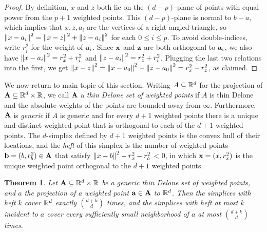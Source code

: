 \documentclass[10pt,a4paper]{article}
\newtheorem{theorem}{Theorem}[section]
\newcommand {\mm}[1] {\ifmmode{#1}\else{\mbox{\(#1\)}}\fi}
\theoremstyle{plain}
\newcommand{\Rspace}        {\mm{{\mathbb R}}}
\newcommand{\AAA}           {\mm{\bf A}}
\newcommand{\aaa}           {\mm{\bf a}}
\newcommand{\bbb}           {\mm{\bf b}}
\newcommand{\xxx}           {\mm{\bf{x}}}
\newcommand{\zzz}           {\mm{\bf{z}}}
\newcommand{\Edist}[2]      {\mm{\|{#1}-{#2}\|}}
\begin{document}
\begin{proof}
  By definition, $x$ and $z$ both lie on the $(d-p)$-plane of points with equal power from the $p+1$ weighted points.
  This $(d-p)$-plane is normal to $b-a$, which implies that $x, z, a_i$ are the vertices of a right-angled triangle, so $\Edist{x}{a_i}^2 = \Edist{x}{z}^2 + \Edist{z}{a_i}^2$ for each $0 \leq i \leq p$.
  To avoid double-indices, write $r_i^2$ for the weight of $\aaa_i$.
  Since $\xxx$ and $\zzz$ are both orthogonal to $\aaa_i$, we also have $\Edist{x}{a_i}^2 = r_x^2 + r_i^2$ and $\Edist{z}{a_i}^2 = r_z^2 + r_i^2$.
  Plugging the last two relations into the first, we get $\Edist{x}{z}^2 = \Edist{x}{a_0}^2 - \Edist{z}{a_0}^2 = r_x^2 - r_z^2$, as claimed.
\end{proof}
We now return to main topic of this section.
Writing $A \subseteq \Rspace^d$ for the projection of $\AAA \subseteq \Rspace^d \times \Rspace$, we call $\AAA$ a \emph{thin Delone set of weighted points} if $A$ is thin Delone and the absolute weights of the points are bounded away from $\infty$.
Furthermore, $\AAA$ is \emph{generic} if $A$ is generic and for every $d+1$ weighted points there is a unique and distinct weighted point that is orthogonal to each of the $d+1$ weighted points.
The $d$-simplex defined by $d+1$ weighted points is the convex hull of their locations, and the \emph{heft} of this simplex is the number of weighted points $\bbb = (b, r_b^2) \in \AAA$ that satisfy $\Edist{x}{b}^2 - r_x^2 - r_b^2$ < 0, in which $\xxx = (x, r_x^2)$ is the unique weighted point orthogonal to the $d+1$ weighted points.
\begin{theorem}
  \label{thm:covering_for_weighted_points}
  Let $\AAA \subseteq \Rspace^d \times \Rspace$ be a generic thin Delone set of weighted points, and $a$ the projection of a weighted point $\aaa \in \AAA$ to $\Rspace^d$.
  Then the simplices with heft $k$ cover $\Rspace^d$ exactly $\binom{d+k}{d}$ times, and the simplices with heft at most $k$ incident to $a$ cover every sufficiently small neighborhood of $a$ at most $\binom{d+k}{d}$ times.
\end{theorem}
\end{document}
